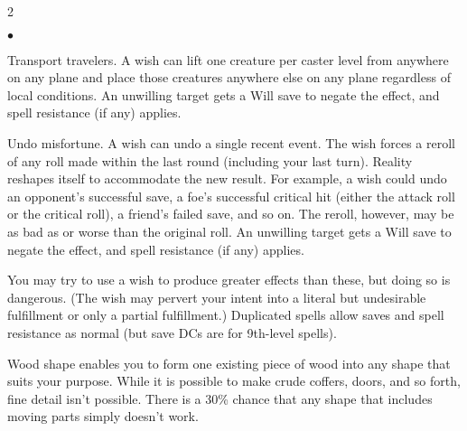 \begin{multicols}{2}
\begin{small}
\begin{list}{$\bullet$}{\itemspace}
  \item Transport travelers. A wish can lift one creature per caster level from anywhere on any plane and place those creatures anywhere else on any plane regardless of local conditions. An unwilling target gets a Will save to negate the effect, and spell resistance (if any) applies.
  \item Undo misfortune. A wish can undo a single recent event. The wish forces a reroll of any roll made within the last round (including your last turn). Reality reshapes itself to accommodate the new result. For example, a wish could undo an opponent's successful save, a foe's successful critical hit (either the attack roll or the critical roll), a friend's failed save, and so on. The reroll, however, may be as bad as or worse than the original roll. An unwilling target gets a Will save to negate the effect, and spell resistance (if any) applies.
\end{list}

\smallskip\noindent You may try to use a wish to produce greater effects than these, but doing so is dangerous. (The wish may pervert your intent into a literal but undesirable fulfillment or only a partial fulfillment.)
Duplicated spells allow saves and spell resistance as normal (but save DCs are for 9th-level spells).


\noindent Wood shape enables you to form one existing piece of wood into any shape that suits your purpose. While it is possible to make crude coffers, doors, and so forth, fine detail isn't possible. There is a 30\% chance that any shape that includes moving parts simply doesn't work.


\end{small}
\end{multicols}
